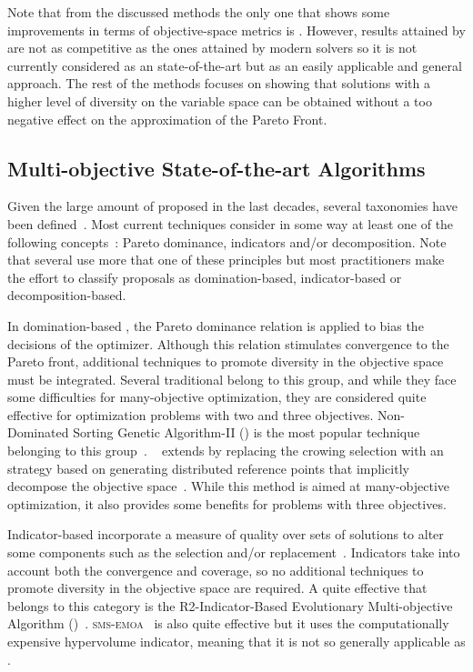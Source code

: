 Note that from the discussed methods the only one that shows some improvements in terms of objective-space metrics is \GDEA{}.
%
However, results attained by \GDEA{} are not as competitive as the ones attained by modern solvers so it is not currently
considered as an state-of-the-art \MOEA{} but as an easily applicable and general approach.
%
The rest of the methods focuses on showing that solutions with a higher level of diversity on the variable space
can be obtained without a too negative effect
on the approximation of the Pareto Front.


\subsection{Multi-objective State-of-the-art Algorithms}

Given the large amount of \MOEAS{} proposed in the last decades, several taxonomies have been defined~\cite{bechikh2016recent}.
%
Most current techniques consider in some way at least one of the following concepts~\cite{trivedi2016survey}:
Pareto dominance, indicators and/or decomposition.
%
Note that several \MOEAS{} use more that one of these principles but most practitioners make the effort to classify
proposals as domination-based, indicator-based or decomposition-based.

In domination-based \MOEAS{}, the Pareto dominance relation is applied to bias the decisions of the optimizer.
%
Although this relation stimulates convergence to the Pareto front, additional techniques to promote
diversity in the objective space must be integrated.
%
Several traditional \MOEAS{} belong to this group, and while they face some difficulties for many-objective
optimization, they are considered quite effective for optimization problems with two and three objectives.
%
Non-Dominated Sorting Genetic Algorithm-II (\NSGAII{}) is the most popular technique belonging to this group~\cite{deb2002fast}.
%
\NSGAIII{}~\cite{deb2013evolutionary} extends \NSGAII{} by replacing the crowing selection with an strategy 
based on generating distributed reference points that implicitly decompose the objective space~\cite{trivedi2016survey}.
%
While this method is aimed at many-objective optimization, it also provides some benefits for problems with three objectives.

Indicator-based \MOEAS{} incorporate a measure of quality over sets of solutions to alter some components such as the 
selection and/or replacement~\cite{beume2007sms}.
%
Indicators take into account both the convergence and coverage, so no additional techniques to promote diversity
in the objective space are required.
%
A quite effective \MOEA{} that belongs to this category is the R2-Indicator-Based Evolutionary Multi-objective 
Algorithm (\RMOEA{})~\cite{trautmann2013r2}.
%
\textsc{sms-emoa}~\cite{Joel:SMSEMOA} is also quite effective 
but it uses the computationally expensive hypervolume indicator, meaning that it is not so generally applicable as \RMOEA{}.


